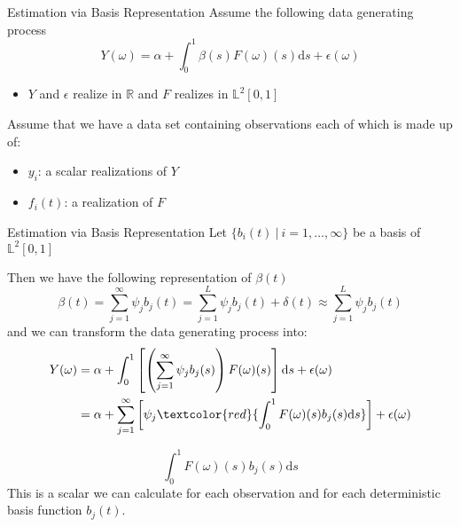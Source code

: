 \documentclass{beamer}
\begin{document}
	\begin{frame}{Estimation via Basis Representation}
		Assume the following data generating process
		$$Y(\omega) = \alpha + \int_{0}^{1} \beta(s) F(\omega)(s) \mathrm{d}s + \epsilon(\omega)$$
		\begin{itemize}
			\item $Y$ and $\epsilon$ realize in $\mathbb{R}$ and $F$ realizes in $\mathbb{L}^2[0,1]$
		\end{itemize}
		\vspace{0.2cm}
		
		Assume that we have a data set containing observations each of which is made up of:
		\begin{itemize}
			\item $y_i$: \quad a scalar realizations of $Y$
			\item $f_i(t)$: \quad a realization of $F$
		\end{itemize}

	\end{frame}

	\begin{frame}{Estimation via Basis Representation}
		Let $\{b_i(t) \: \vert \: i = 1, \dots, \infty\}$ be a basis of $\mathbb{L}^2[0,1]$
		\vspace{0.2cm}
		
		Then we have the following representation of $\beta(t)$
		$$\beta(t) = \sum_{j = 1}^{\infty} \psi_j b_j(t) = \sum_{j = 1}^{L} \psi_j b_j(t) + \delta(t) \approx \sum_{j = 1}^{L} \psi_j b_j(t)$$
		and we can transform the data generating process into:
		\begin{equation}\notag
			\begin{split}
				Y(\omega) & = \alpha + \int_{0}^{1}\left[\left(\sum_{j = 1}^{\infty} \psi_j  b_j(s)\right) F(\omega)(s) \right]\mathrm{d}s + \epsilon(\omega) \\
						  & = \alpha + \sum_{j = 1}^{\infty} \left[\psi_j \textcolor{red}{\int_{0}^{1} F(\omega)(s) b_j(s)\mathrm{d}s}\right] + \epsilon(\omega)	  
			\end{split}
		\end{equation}
	\end{frame}

	\begin{frame}
		$$\int_{0}^{1} F(\omega)(s) b_j(s)\mathrm{d}s$$ 
		This is a scalar we can calculate for each observation and for each deterministic basis function $b_j(t)$.
	\end{frame}
\end{document}
